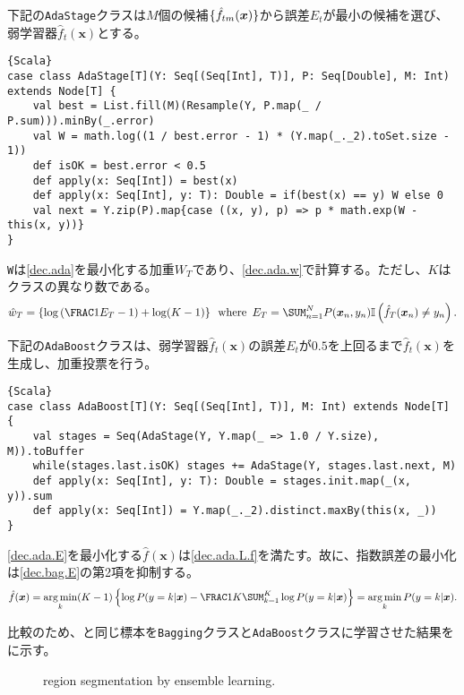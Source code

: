 \documentclass[10pt,a4paper]{book}
\begin{document}
下記の\texttt{AdaStage}クラスは$M$個の候補$\seq{\hat{f}_{tm}(\bm{x})}$から誤差$E_t$が最小の候補を選び、弱学習器$\hat{f}_t(\bm{x})$とする。

\begin{Verbatim}{Scala}
case class AdaStage[T](Y: Seq[(Seq[Int], T)], P: Seq[Double], M: Int) extends Node[T] {
	val best = List.fill(M)(Resample(Y, P.map(_ / P.sum))).minBy(_.error)
	val W = math.log((1 / best.error - 1) * (Y.map(_._2).toSet.size - 1))
	def isOK = best.error < 0.5
	def apply(x: Seq[Int]) = best(x)
	def apply(x: Seq[Int], y: T): Double = if(best(x) == y) W else 0
	val next = Y.zip(P).map{case ((x, y), p) => p * math.exp(W - this(x, y))}
}
\end{Verbatim}

\texttt{W}は\eqref{dec.ada}を最小化する加重$W_T$であり、\eqref{dec.ada.w}で計算する。ただし、$K$はクラスの異なり数である。
%
\begin{equation}
\label{eq:dec.ada.w}
\hat{w}_T = \seq{\log \left(\frac{1}{E_T} - 1\right) + \log (K-1)} \where E_T = \sum_{n=1}^N P(\bm{x}_n,y_n) \Ii{\hat{f}_T(\bm{x}_n) \neq y_n}.
\end{equation}

下記の\texttt{AdaBoost}クラスは、弱学習器$\hat{f}_t(\bm{x})$の誤差$E_t$が$0.5$を上回るまで$\hat{f}_t(\bm{x})$を生成し、加重投票を行う。

\begin{Verbatim}{Scala}
case class AdaBoost[T](Y: Seq[(Seq[Int], T)], M: Int) extends Node[T] {
	val stages = Seq(AdaStage(Y, Y.map(_ => 1.0 / Y.size), M)).toBuffer
	while(stages.last.isOK) stages += AdaStage(Y, stages.last.next, M)
	def apply(x: Seq[Int], y: T): Double = stages.init.map(_(x, y)).sum
	def apply(x: Seq[Int]) = Y.map(_._2).distinct.maxBy(this(x, _))
}
\end{Verbatim}

\eqref{dec.ada.E}を最小化する$\hat{f}(\bm{x})$は\eqref{dec.ada.L.f}を満たす。故に、指数誤差の最小化は\eqref{dec.bag.E}の第2項を抑制する。
%
\begin{equation}
\label{eq:dec.ada.L.f}
\hat{f}(\bm{x}) = \argmin_k (K-1) \seq{\log P(y=k|\bm{x}) - \frac{1}{K} \sum_{k=1}^K \log P(y=k|\bm{x})} = \argmin_k P(y=k|\bm{x}).
\end{equation}

比較のため、と同じ標本を\texttt{Bagging}クラスと\texttt{AdaBoost}クラスに学習させた結果をに示す。

\begin{figure}[h]
\centering
{}
\caption{region segmentation by ensemble learning.\label{fig:dec.ensem}}
\end{figure}
\end{document}
